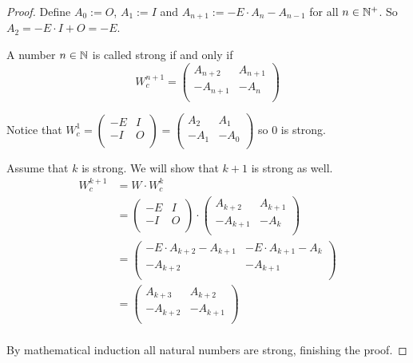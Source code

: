 \begin{proof}
  Define $A_{0} := O$, $A_{1} := I$ and
  $A_{n+1} := -E \cdot A_{n} - A_{n-1}$ for all $n\in\mathbb{N}^{+}$. So
  $A_{2} = -E \cdot I + O = -E$.

  A number $n\in\mathbb{N}$ is called strong if and only if
  \[
  W_{c}^{n+1}
  =
  \left(
  \begin{array}{cc}
     A_{n+2} &  A_{n+1} \\
    -A_{n+1} & -A_{n}   \\
  \end{array}
  \right)
  \]

  Notice that
  $W_{c}^{1} = \left(\begin{smallmatrix} -E & I \\ -I & O \\\end{smallmatrix}\right) = \left(\begin{smallmatrix} A_{2} & A_{1} \\ -A_{1} & -A_{0} \\\end{smallmatrix}\right)$
  so $0$ is strong.

  Assume that $k$ is strong. We will show that $k+1$ is strong as well.
  \[
  \begin{aligned}
  W_{c}^{k+1}
  & = W \cdot W_{c}^{k} \\
  & =
  \left(
  \begin{array}{cc}
    -E & I \\
    -I & O \\
  \end{array}
  \right)
  \cdot
  \left(
  \begin{array}{cc}
     A_{k+2} &  A_{k+1} \\
    -A_{k+1} & -A_{k}   \\
  \end{array}
  \right) \\
  & =
  \left(
  \begin{array}{cc}
    -E \cdot A_{k+2} - A_{k+1} & -E \cdot A_{k+1} - A_{k} \\
    -A_{k+2}                  & -A_{k+1}                 \\
  \end{array}
  \right) \\
  & =
  \left(
  \begin{array}{cc}
     A_{k+3} &  A_{k+2} \\
    -A_{k+2} & -A_{k+1} \\
  \end{array}
  \right) \\
  \end{aligned}
  \]

  By mathematical induction all natural
  numbers are strong, finishing the proof.
\end{proof}

